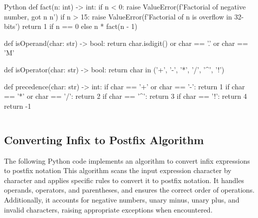     \begin{code}{Python}
        def fact(n: int) -> int:
            if n < 0:
                raise ValueError(f'Factorial of negative number, got n {n}')
            if n > 15:
                raise ValueError(f'Factorial of {n} is overflow in 32-bits')
            return 1 if n == 0 else n * fact(n - 1)
        
        def isOperand(char: str) -> bool:
            return char.isdigit() or char == '.' or char == 'M'
        
        def isOperator(char: str) -> bool:
            return char in ('+', '-', '*', '/', '^', '!')
        
        def precedence(char: str) -> int:
            if char == '+' or char == '-': return 1
            if char == '*' or char == '/': return 2
            if char == '^': return 3
            if char == '!': return 4
            return -1
    \end{code}
    \begin{lstlisting}[language=Python, caption=Support function in Python]
    \end{lstlisting}

\subsection{Converting Infix to Postfix Algorithm}
\label{sec:5.INFIX_TO_POSTFIX}
    The following Python code implements an algorithm to convert infix expressions to postfix notation   
    This algorithm scans the input expression character by character and applies specific rules to convert it to postfix notation. It handles operands, operators, and parentheses, and ensures the correct order of operations. Additionally, it accounts for negative numbers, unary minus, unary plus, and invalid characters, raising appropriate exceptions when encountered.
    
